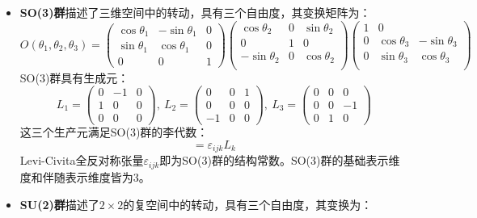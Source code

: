 \begin{itemize}
    \item \textbf{SO(3)群}描述了三维空间中的转动，具有三个自由度，其变换矩阵为：
    \begin{equation}
        O(\theta_1, \theta_2, \theta_3) = \begin{pmatrix}
            \cos\theta_1& -\sin\theta_1& 0\\
            \sin\theta_1& \cos\theta_1& 0\\
            0& 0& 1
        \end{pmatrix}\begin{pmatrix}
            \cos\theta_2& 0& \sin\theta_2\\
            0& 1& 0\\
            -\sin\theta_2& 0& \cos\theta_2\\
        \end{pmatrix}\begin{pmatrix}
        1& 0& \\
           0& \cos\theta_3& -\sin\theta_3\\
           0& \sin\theta_3& \cos\theta_3\\
        \end{pmatrix}
    \end{equation}
    SO(3)群具有生成元：
    \begin{equation}
        L_1 = \begin{pmatrix}
            0& -1& 0\\
            1& 0& 0\\
            0& 0& 0
        \end{pmatrix},~L_2 = \begin{pmatrix}
            0& 0& 1\\
            0& 0& 0\\
            -1& 0& 0
        \end{pmatrix},~L_3 = \begin{pmatrix}
            0& 0& 0\\
            0& 0& -1\\
            0& 1& 0
        \end{pmatrix}
    \end{equation}
    这三个生产元满足SO(3)群的李代数：
    \begin{equation}
        [L_i, L_j]=\varepsilon_{ijk}L_k
    \end{equation}
    Levi-Civita全反对称张量$\varepsilon_{ijk}$即为SO(3)群的结构常数。SO(3)群的基础表示维度和伴随表示维度皆为3。
    \item\textbf{SU(2)群}描述了$2\times2$的复空间中的转动，具有三个自由度，其变换为：

\end{itemize}
